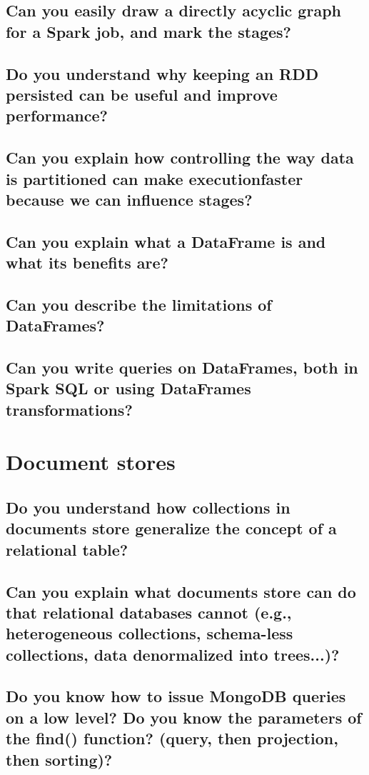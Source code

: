 \documentclass{article}
\begin{document}
\subsection{Can you easily draw a directly acyclic graph for a Spark job, and mark the stages?}
\subsection{Do you understand why keeping an RDD persisted can be useful and improve performance?}
\subsection{Can you explain how controlling the way data is partitioned can make executionfaster because we can influence stages?}
\subsection{Can you explain what a DataFrame is and what its benefits are?}
\subsection{Can you describe the limitations of DataFrames?}
\subsection{Can you write queries on DataFrames, both in Spark SQL or using DataFrames transformations?}

\pagebreak

\section{Document stores}
\subsection{Do you understand how collections in documents store generalize the concept of a relational table?}



\subsection{Can you explain what documents store can do that relational databases cannot (e.g., heterogeneous collections, schema-less collections, data denormalized into trees...)?}
\subsection{Do you know how to issue MongoDB queries on a low level? Do you know the parameters of the find() function? (query, then projection, then sorting)?}
\end{document}
